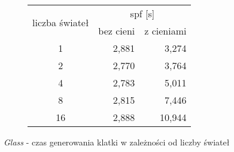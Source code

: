 \begin{figure}[H]
\begin{subfigure}{.45\textwidth}
\end{subfigure}
\hfill
\begin{subfigure}{.45\textwidth}
		\caption{Tabla z wynikami}
		\begin{longtable}{|c|r|r|} \hline
		\multirow{2}{*}{liczba świateł} & \multicolumn{2}{|c|}{spf [s]} \\ \cline{2-3}
	    & bez cieni & z cieniami \\ \hline
	    1 & 2,881 & 3,274 \\
	    2 & 2,770 & 3,764 \\
		4 & 2,783 & 5,011 \\
		8 & 2,815 & 7,446 \\
		16 & 2,888 & 10,944 \\
		\hline
		\end{longtable}
\end{subfigure}
\caption{\emph{Glass} - czas generowania klatki w zależności od liczby świateł}
\end{figure}

